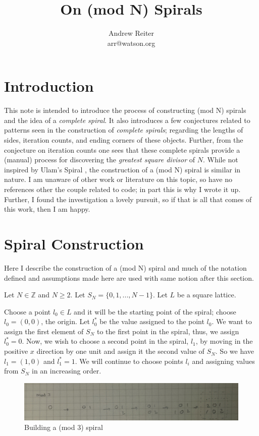 \documentclass[11pt]{amsart}
\title{On (mod N) Spirals}
\author{Andrew Reiter\\
arr@watson.org}
\theoremstyle{mydef}
\begin{document}
\maketitle
\section{Introduction}
This note is intended to introduce the process of constructing (mod N) spirals and the idea of a \textit{complete spiral}.  It also introduces a few conjectures related to patterns seen in the construction of \textit{complete spirals}; regarding the lengths of sides, iteration counts, and ending corners of these objects. Further, from the conjecture on iteration counts one sees that these complete spirals provide a (manual) process for discovering the \textit{greatest square divisor} of $N$. While not inspired by Ulam's Spiral \cite{Ulam}, the construction of  a (mod N) spiral is similar in nature. I am unaware of other work or literature on this topic, so have no references other the couple related to code; in part this is why I wrote it up. Further, I found the investigation a lovely pursuit, so if that is all that comes of this work, then I am happy.

\section{Spiral Construction}
Here I describe the construction of a (mod N) spiral and much of the notation defined and assumptions made here are used with same notion after this section.

Let $N \in \mathbb{Z}$ and $N \ge 2$. Let $S_N = \{ 0, 1, ..., N-1 \}$. Let $L$ be a square lattice. 

Choose a point $l_0 \in L$ and it will be the starting point of the spiral; choose $l_0 = (0, 0)$, the origin. Let $l^*_0$ be the value assigned to the point $l_0$. We want to assign the first element of $S_N$ to the first point in the spiral, thus, we assign $l^*_0 = 0$. Now, we wish to choose a second point in the spiral, $l_1$, by moving in the positive $x$ direction by one unit and assign it the second value of $S_N$. So we have $l_1 = (1, 0)$ and $l^*_1 = 1$.  We will continue to choose points $l_i$ and assigning values from $S_N$ in an increasing order.

\begin{figure}[h]
\centering
\includegraphics[scale=0.3]{mod3basic.png}
\caption{Building a (mod 3) spiral}
\label{fig:mod3spiral}
\end{figure}
\end{document}
